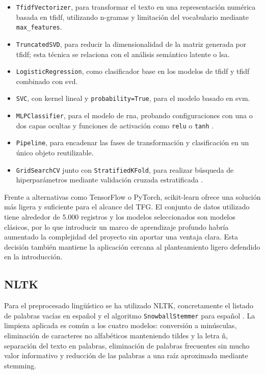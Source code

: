\begin{itemize}
	\item \texttt{TfidfVectorizer}, para transformar el texto en una representación numérica basada en \gls{tfidf}, utilizando n-gramas y limitación del vocabulario mediante \texttt{max\_features}.
	
	\item \texttt{TruncatedSVD}, para reducir la dimensionalidad de la matriz generada por \gls{tfidf}; esta técnica se relaciona con el análisis semántico latente o \gls{lsa}.
	
	\item \texttt{LogisticRegression}, como clasificador base en los modelos de \gls{tfidf} y \gls{tfidf} combinado con \gls{svd}.
	
	\item \texttt{SVC}, con kernel lineal y \texttt{probability=True}, para el modelo basado en \gls{svm}.
	
	\item \texttt{MLPClassifier}, para el modelo de \gls{rna}, probando configuraciones con una o dos capas ocultas y funciones de activación como \texttt{relu} o \texttt{tanh} \cite{scikit_mlp}.
	
	\item \texttt{Pipeline}, para encadenar las fases de transformación y clasificación en un único objeto reutilizable.
	
	\item \texttt{GridSearchCV} junto con \texttt{StratifiedKFold}, para realizar búsqueda de hiperparámetros mediante validación cruzada estratificada \cite{dergipark_optimization}.
\end{itemize}

Frente a alternativas como TensorFlow o PyTorch, scikit-learn ofrece una solución más ligera y suficiente para el alcance del TFG. El conjunto de datos utilizado tiene alrededor de 5.000 registros y los modelos seleccionados son modelos clásicos, por lo que introducir un marco de aprendizaje profundo habría aumentado la complejidad del proyecto sin aportar una ventaja clara. Esta decisión también mantiene la aplicación cercana al planteamiento ligero defendido en la introducción.

\subsection{NLTK}

Para el preprocesado lingüístico se ha utilizado NLTK, concretamente el listado de palabras vacías en español y el algoritmo \texttt{SnowballStemmer} para español \cite{snowball_org}. La limpieza aplicada es común a los cuatro modelos: conversión a minúsculas, eliminación de caracteres no alfabéticos manteniendo tildes y la letra ñ, separación del texto en palabras, eliminación de palabras frecuentes sin mucho valor informativo y reducción de las palabras a una raíz aproximada mediante \gls{stemming}.

